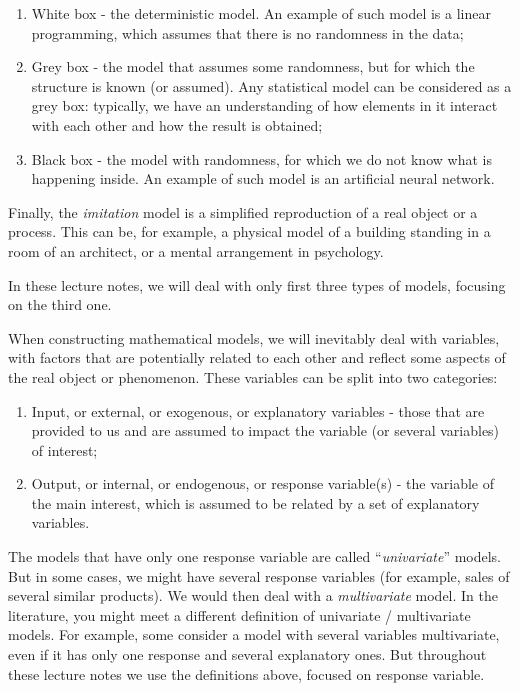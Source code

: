 \documentclass[
]{book}
\providecommand{\tightlist}{%
  \setlength{\itemsep}{0pt}\setlength{\parskip}{0pt}}
\theoremstyle{definition}
\theoremstyle{definition}
\theoremstyle{definition}
\theoremstyle{definition}
\theoremstyle{remark}
\begin{document}
\begin{enumerate}
\def\labelenumi{\alph{enumi}.}
\tightlist
\item
  White box - the deterministic model. An example of such model is a linear programming, which assumes that there is no randomness in the data;
\item
  Grey box - the model that assumes some randomness, but for which the structure is known (or assumed). Any statistical model can be considered as a grey box: typically, we have an understanding of how elements in it interact with each other and how the result is obtained;
\item
  Black box - the model with randomness, for which we do not know what is happening inside. An example of such model is an artificial neural network.
\end{enumerate}

Finally, the \emph{imitation} model is a simplified reproduction of a real object or a process. This can be, for example, a physical model of a building standing in a room of an architect, or a mental arrangement in psychology.

In these lecture notes, we will deal with only first three types of models, focusing on the third one.

When constructing mathematical models, we will inevitably deal with variables, with factors that are potentially related to each other and reflect some aspects of the real object or phenomenon. These variables can be split into two categories:

\begin{enumerate}
\def\labelenumi{\arabic{enumi}.}
\tightlist
\item
  Input, or external, or exogenous, or explanatory variables - those that are provided to us and are assumed to impact the variable (or several variables) of interest;
\item
  Output, or internal, or endogenous, or response variable(s) - the variable of the main interest, which is assumed to be related by a set of explanatory variables.
\end{enumerate}

The models that have only one response variable are called ``\emph{univariate}'' models. But in some cases, we might have several response variables (for example, sales of several similar products). We would then deal with a \emph{multivariate} model. In the literature, you might meet a different definition of univariate / multivariate models. For example, some consider a model with several variables multivariate, even if it has only one response and several explanatory ones. But throughout these lecture notes we use the definitions above, focused on response variable.
\end{document}
